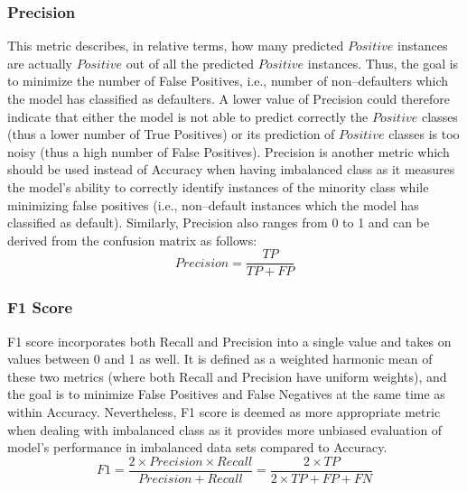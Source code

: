 \newpage
\subsubsection{Precision}
This metric describes, in relative terms, how many predicted $Positive$ instances are actually $Positive$ out of all the predicted $Positive$ instances. Thus, the goal is to minimize the number of False Positives, i.e., number of non--defaulters which the model has classified as defaulters.
A lower value of Precision could therefore indicate that either the model is not able to predict correctly the $Positive$ classes (thus a lower number of True Positives) or its prediction of $Positive$ classes is too noisy (thus a high number of False Positives).
Precision is another metric which should be used instead of Accuracy when having imbalanced class as it measures the model's ability to correctly identify instances of the minority class while minimizing false positives (i.e., non--default instances which the model has classified as default).
Similarly, Precision also ranges from 0 to 1 and can be derived from the confusion matrix as follows:
\begin{equation}\label{eq}
    Precision = \frac{TP}{TP + FP}
\end{equation}
\subsubsection{F1 Score}
F1 score incorporates both Recall and Precision into a single value and takes on values between 0 and 1 as well.
It is defined as a weighted harmonic mean of these two metrics \citep{brabec2020model} (where both Recall and Precision have uniform weights), and the goal is to minimize False Positives and False Negatives at the same time as within Accuracy.
Nevertheless, F1 score is deemed as more appropriate metric when dealing with imbalanced class as it provides more unbiased evaluation of model's performance in imbalanced data sets compared to Accuracy.
\begin{equation}\label{eq}
    F1 = \frac{2 \times Precision \times Recall}{Precision + Recall} = \frac{2 \times TP}{2 \times TP + FP + FN}
\end{equation}

\newpage
